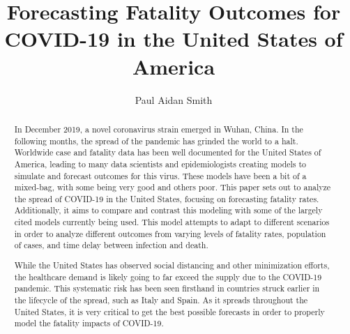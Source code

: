 \documentclass[conference]{IEEEtran}
\begin{document}
\title{Forecasting Fatality Outcomes for COVID-19 in the United States of America}


\author{Paul Aidan Smith \\
}

\maketitle

\begin{abstract}
In December 2019, a novel coronavirus strain emerged in Wuhan, China.  In the following months, the spread of the pandemic has grinded the world to a halt.  Worldwide case and fatality data has been well documented for the United States of America, leading to many data scientists and epidemiologists creating models to simulate and forecast outcomes for this virus.  These models have been a bit of a mixed-bag, with some being very good and others poor. This paper sets out to analyze the spread of COVID-19 in the United States, focusing on forecasting fatality rates.  Additionally, it aims to compare and contrast this modeling with some of the largely cited models currently being used. This model attempts to adapt to different scenarios in order to analyze different outcomes from varying levels of fatality rates, population of cases, and time delay between infection and death.

While the United States has observed social distancing and other minimization efforts, the healthcare demand is likely going to far exceed the supply due to the COVID-19 pandemic.  This systematic risk has been seen firsthand in countries struck earlier in the lifecycle of the spread, such as Italy and Spain.  As it spreads throughout the United States, it is very critical to get the best possible forecasts in order to properly model the fatality impacts of COVID-19. 

\end{abstract}













\end{document}
